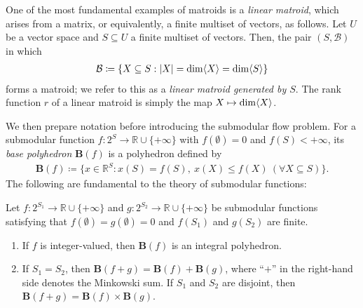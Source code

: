 \documentclass[a4paper,11pt]{article}
\numberwithin{equation}{section}
\newcommand{\R}{\mathbb{R}}
\newcommand{\BB}{\mathbf{B}}
\DeclarePairedDelimiter{\spnn}{\langle}{\rangle}
\begin{document}
\begin{example}\label{ex:linear-matroid}
    One of the most fundamental examples of matroids is a \emph{linear matroid}, which arises from a matrix, or equivalently, a finite multiset of vectors, as follows.
Let $U$ be a vector space and $S \subseteq U$ a finite multiset of vectors.
Then, the pair $(S, \mathcal{B})$ in which
\begin{align}
    \mathcal{B} \coloneqq \{ X \subseteq S : |X| = \dim \spnn{X} = \dim \spnn{S} \}
\end{align}
forms a matroid; we refer to this as a \emph{linear matroid generated by $S$}.
The rank function $r$ of a linear matroid is simply the map $X \mapsto \dim \spnn{X}$.
\end{example}


We then prepare notation
before introducing the submodular flow problem.
For a submodular function $f : 2^S \to \R \cup \{+\infty\}$ with $f(\emptyset) = 0$ and $f(S) < +\infty$,
its \emph{base polyhedron} $\BB(f)$ is a polyhedron defined by
\begin{align}
    \BB(f) \coloneqq \{ x \in \R^S : x(S) = f(S),\  x(X) \leq f(X) \ (\forall X \subseteq S) \}.
\end{align}
The following are fundamental to the theory of submodular functions:
\begin{lemma}\label{lem:submodular-polyhedron}
    Let $f : 2^{S_1} \to \R \cup \{+\infty\}$ and $g : 2^{S_2} \to \R \cup \{+\infty\}$ be submodular functions satisfying that $f(\emptyset) = g(\emptyset) = 0$ and $f(S_1)$ and $g(S_2)$ are finite.
    \begin{enumerate}[{label={\textup{(\arabic*)}}}]
        \item If $f$ is integer-valued,
        then $\BB(f)$ is an integral polyhedron.
        \item If $S_1 = S_2$, then $\BB(f + g) = \BB(f) + \BB(g)$, where ``$+$'' in the right-hand side denotes the Minkowski sum.
        If $S_1$ and $S_2$ are disjoint, then $\BB(f + g) = \BB(f) \times \BB(g)$.
    \end{enumerate}
\end{lemma}
\end{document}
